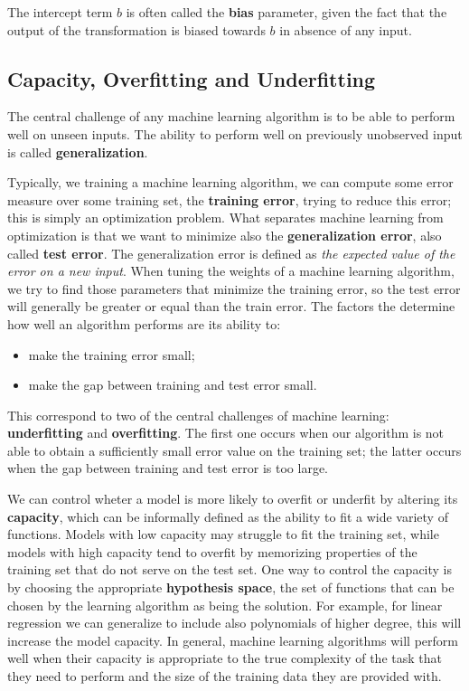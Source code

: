 The intercept term $b$ is often called the \textbf{bias} parameter, given the fact that the output of the transformation is biased towards $b$ in absence of any input.

\subsection{Capacity, Overfitting and Underfitting}
The central challenge of any machine learning algorithm is to be able to perform well on unseen inputs. The ability to perform well on previously unobserved input is called \textbf{generalization}.

Typically, we training a machine learning algorithm, we can compute some error measure over some training set, the \textbf{training error}, trying to reduce this error; this is simply an optimization problem. What separates machine learning from optimization is that we want to minimize also the \textbf{generalization error}, also called \textbf{test error}. The generalization error is defined as \textit{the expected value of the error on a new input}. When tuning the weights of a machine learning algorithm, we try to find those parameters that minimize the training error, so the test error will generally be greater or equal than the train error. The factors the determine how well an algorithm performs are its ability to:
\begin{itemize}
    \item make the training error small;
    \item make the gap between training and test error small.
\end{itemize}
This correspond to two of the central challenges of machine learning: \textbf{underfitting} and \textbf{overfitting}. The first one occurs when our algorithm is not able to obtain a sufficiently small error value on the training set; the latter occurs when the gap between training and test error is too large.

We can control wheter a model is more likely to overfit or underfit by altering its \textbf{capacity}, which can be informally defined as the ability to fit a wide variety of functions. Models with low capacity may struggle to fit the training set, while models with high capacity tend to overfit by memorizing properties of the training set that do not serve on the test set. One way to control the capacity is by choosing the appropriate \textbf{hypothesis space}, the set of functions that can be chosen by the learning algorithm as being the solution. For example, for linear regression we can generalize to include also polynomials of higher degree, this will increase the model capacity. In general, machine learning algorithms will perform well when their capacity is appropriate to the true complexity of the task that they need to perform and the size of the training data they are provided with.